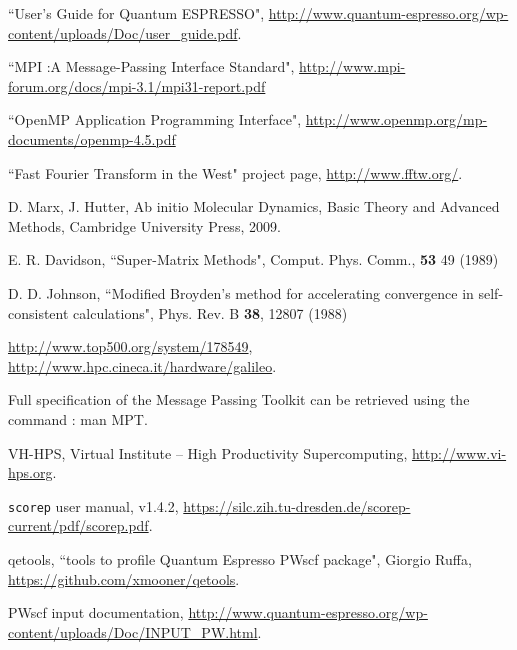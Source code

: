 \documentclass[a4paper,12pt]{article}
\begin{document}
\begin{thebibliography}{9}
``User's Guide for Quantum ESPRESSO", \url{http://www.quantum-espresso.org/wp-content/uploads/Doc/user_guide.pdf}.

``MPI :A Message-Passing Interface Standard", \url{http://www.mpi-forum.org/docs/mpi-3.1/mpi31-report.pdf}

``OpenMP Application Programming Interface", \url{http://www.openmp.org/mp-documents/openmp-4.5.pdf}

``Fast Fourier Transform in the West" project page, \url{http://www.fftw.org/}.


D. Marx, J. Hutter,
Ab initio Molecular Dynamics,
Basic Theory and Advanced Methods,
Cambridge University Press,
2009.

E. R. Davidson, ``Super-Matrix Methods", Comput. Phys. Comm., \textbf{53} 49 (1989)

D. D. Johnson, ``Modified Broyden’s method for accelerating convergence in self-consistent calculations", Phys. Rev. B \textbf{38}, 12807 (1988)

\url{http://www.top500.org/system/178549},
\url{http://www.hpc.cineca.it/hardware/galileo}.

Full specification of the Message Passing Toolkit can be retrieved using the command : man MPT.

VH-HPS, 
Virtual Institute – High Productivity Supercomputing, 
\url{http://www.vi-hps.org}.

\texttt{scorep} user manual, 
v1.4.2,
\url{https://silc.zih.tu-dresden.de/scorep-current/pdf/scorep.pdf}.

qetools, ``tools to profile Quantum Espresso PWscf package", Giorgio Ruffa, \url{https://github.com/xmooner/qetools}.

PWscf input documentation, \url{http://www.quantum-espresso.org/wp-content/uploads/Doc/INPUT_PW.html}.


\end{thebibliography}
\end{document}
